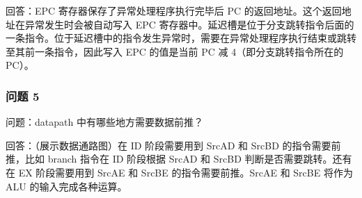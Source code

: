 回答：EPC 寄存器保存了异常处理程序执行完毕后 PC 的返回地址。这个返回地址在异常发生时会被自动写入 EPC 寄存器中。延迟槽是位于分支跳转指令后面的一条指令。位于延迟槽中的指令发生异常时，需要在异常处理程序执行结束或跳转至其前一条指令，因此写入 EPC 的值是当前 PC 减 4（即分支跳转指令所在的 PC）。

\subsubsection{问题 5}
问题：datapath 中有哪些地方需要数据前推？

回答：（展示数据通路图）在 ID 阶段需要用到 SrcAD 和 SrcBD 的指令需要前推，比如 branch 指令在 ID 阶段根据 SrcAD 和 SrcBD 判断是否需要跳转。还有在 EX 阶段需要用到 SrcAE 和 SrcBE 的指令需要前推。SrcAE 和 SrcBE 将作为 ALU 的输入完成各种运算。